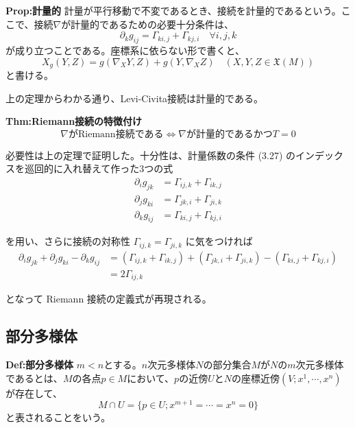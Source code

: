\documentclass[a4paper,11pt]{jsarticle}
\numberwithin{equation}{section}
\begin{document}
\begin{itembox}[l]{\textbf{Prop:計量的}}
    計量が平行移動で不変であるとき、接続を計量的であるという。ここで、接続$\nabla$が計量的であるための必要十分条件は、
    \begin{equation}
        \partial_k g_{ij} = \Gamma_{ki,j} + \Gamma_{kj,i} \quad \forall i,j,k
    \end{equation}
    が成り立つことである。座標系に依らない形で書くと、
    \begin{equation}
        X_g(Y, Z) = g(\nabla_X Y, Z) + g(Y, \nabla_X Z) \quad (X, Y, Z \in \mathfrak{X}(M))
    \end{equation}
    と書ける。
\end{itembox}
上の定理からわかる通り、Levi-Civita接続は計量的である。\\

\begin{itembox}[l]{\textbf{Thm:Riemann接続の特徴付け}}
    \begin{equation}
        \nabla \text{がRiemann接続である} \Leftrightarrow \nabla \text{が計量的であるかつ} T=0
    \end{equation}

\end{itembox}
必要性は上の定理で証明した。十分性は、計量係数の条件 (3.27) のインデックスを巡回的に入れ替えて作った3つの式
\begin{align}
    \partial_i g_{jk} &= \Gamma_{ij,k} + \Gamma_{ik,j} \\
    \partial_j g_{ki} &= \Gamma_{jk,i} + \Gamma_{ji,k} \\
    \partial_k g_{ij} &= \Gamma_{ki,j} + \Gamma_{kj,i}
\end{align}

を用い、さらに接続の対称性 \(\Gamma_{ij,k} = \Gamma_{ji,k}\) に気をつければ
\begin{align}
    \partial_i g_{jk} + \partial_j g_{ki} - \partial_k g_{ij} &= (\Gamma_{ij,k} + \Gamma_{ik,j}) + (\Gamma_{jk,i} + \Gamma_{ji,k}) - (\Gamma_{ki,j} + \Gamma_{kj,i}) \\
    &= 2 \Gamma_{ij,k}
\end{align}

となって Riemann 接続の定義式が再現される。\hfill\qedsymbol

\subsection{部分多様体}
\begin{itembox}[l]{\textbf{Def:部分多様体}}
    $m<n$とする。$n$次元多様体$N$の部分集合$M$が$N$の$m$次元多様体であるとは、$M$の各点$p \in M$において、$p$の近傍$U$と$N$の座標近傍$(V;x^1,\cdots,x^n)$が存在して、
    \begin{equation}
        M \cap U = \{p \in U ; x^{m+1} = \cdots = x^n = 0\}
    \end{equation}
    と表されることをいう。
\end{itembox}
\end{document}
